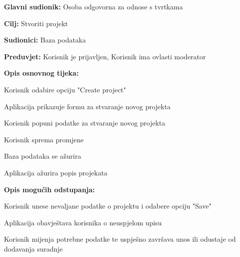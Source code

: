 					\noindent {}
					\begin{packed_item}

						\item \textbf{Glavni sudionik:} Osoba odgovorna za odnose s tvrtkama
						\item \textbf{Cilj:} Stvoriti projekt
						\item \textbf{Sudionici:} Baza podataka
						\item \textbf{Preduvjet:} Korisnik je prijavljen, Korisnik ima ovlasti moderator
						\item \textbf{Opis osnovnog tijeka:}

						\item[] \begin{packed_enum}

							\item Korisnik odabire opciju "Create project"
							\item Aplikacija prikazuje formu za stvaranje novog projekta
							\item Korisnik popuni podatke za stvaranje novog projekta
							\item Korisnik sprema promjene
							\item Baza podataka se ažurira
							\item Aplikacija ažurira popis projekata
						\end{packed_enum}

						\item \textbf{Opis mogućih odstupanja:}

						\item[] \begin{packed_item}

							\item[7.b] Korisnik unese nevaljane podatke o projektu i odabere opciju "Save"
							\item[] \begin{packed_enum}

								\item Aplikacija obavještava korisnika o neuspjelom upisu
								\item Korisnik mijenja potrebne podatke te uspješno završava unos ili
								odustaje od dodavanja suradnje

							\end{packed_enum}

						\end{packed_item}
					\end{packed_item}


